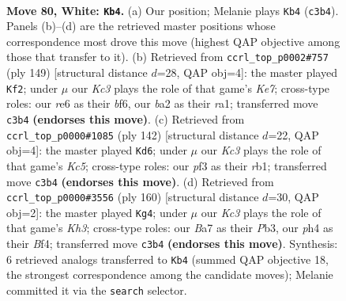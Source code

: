 \documentclass[11pt]{article}
\begin{document}
\clearpage

\begin{figure}[p]\centering
\begin{subfigure}{0.46\textwidth}\centering
\resizebox{\linewidth}{!}{%
\newchessgame
\chessboard[
  setfen={7k/B1R5/4r3/8/B3p2p/2K2p1P/b4P2/8 w - - 70 80},
  showmover=false,
  pgfstyle=straightmove, color=movearrow, markmove={c3-b4}
]}
\caption{}
\end{subfigure}\hfill
\begin{subfigure}{0.46\textwidth}\centering
\resizebox{\linewidth}{!}{%
\newchessgame
\chessboard[
  setfen={8/8/5Bp1/5b1p/7P/5P2/2r1k1PK/R7 b - - 10 75},
  showmover=false,
  pgfstyle=straightmove, color=movearrow, markmove={e2-f2}
]}
\caption{}
\end{subfigure}
\\[4pt]
\begin{subfigure}{0.46\textwidth}\centering
\resizebox{\linewidth}{!}{%
\newchessgame
\chessboard[
  setfen={5k2/6p1/p1B5/P1K1R1P1/8/3b4/8/1r6 w - - 12 72},
  showmover=false,
  pgfstyle=straightmove, color=movearrow, markmove={c5-d6}
]}
\caption{}
\end{subfigure}\hfill
\begin{subfigure}{0.46\textwidth}\centering
\resizebox{\linewidth}{!}{%
\newchessgame
\chessboard[
  setfen={6k1/1p6/p1p1r3/7R/3p1B2/1P4PK/P7/8 w - - 0 81},
  showmover=false,
  pgfstyle=straightmove, color=movearrow, markmove={h3-g4}
]}
\caption{}
\end{subfigure}
\caption{\textbf{Move 80, White: \texttt{Kb4}.} (a) Our position; Melanie plays \texttt{Kb4} (\texttt{c3b4}). Panels (b)--(d) are the retrieved master positions whose correspondence most drove this move (highest QAP objective among those that transfer to it). (b) Retrieved from \texttt{ccrl\_top\_p0002\#757} (ply 149) [structural distance $d$=28, QAP obj=4]: the master played \texttt{Kf2}; under $\mu$ our \emph{Kc3} plays the role of that game's \emph{Ke7}; cross-type roles: our \emph{r}e6 as their \emph{b}f6, our \emph{b}a2 as their \emph{r}a1; transferred move \texttt{c3b4} \textbf{(endorses this move)}. (c) Retrieved from \texttt{ccrl\_top\_p0000\#1085} (ply 142) [structural distance $d$=22, QAP obj=4]: the master played \texttt{Kd6}; under $\mu$ our \emph{Kc3} plays the role of that game's \emph{Kc5}; cross-type roles: our \emph{p}f3 as their \emph{r}b1; transferred move \texttt{c3b4} \textbf{(endorses this move)}. (d) Retrieved from \texttt{ccrl\_top\_p0000\#3556} (ply 160) [structural distance $d$=30, QAP obj=2]: the master played \texttt{Kg4}; under $\mu$ our \emph{Kc3} plays the role of that game's \emph{Kh3}; cross-type roles: our \emph{B}a7 as their \emph{P}b3, our \emph{p}h4 as their \emph{B}f4; transferred move \texttt{c3b4} \textbf{(endorses this move)}. Synthesis: 6 retrieved analogs transferred to \texttt{Kb4} (summed QAP objective 18, the strongest correspondence among the candidate moves); Melanie committed it via the \texttt{search} selector.}
\label{fig:thought-m158}
\end{figure}
\end{document}
